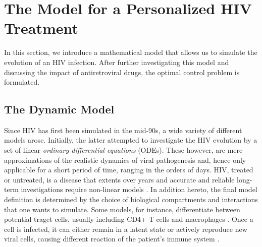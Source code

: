 \section{The Model for a Personalized HIV Treatment}
\label{sec:model}

In this section, we introduce a mathematical model that allows us to simulate the evolution of an HIV infection.
After further investigating this model and discussing the impact of antiretroviral drugs, the optimal control problem is formulated.

\subsection{The Dynamic Model}
\label{subsec:Model_DynModel}

Since HIV has first been simulated in the mid-90s, a wide variety of different models arose.
Initially, the latter attempted to investigate the HIV evolution by a set of linear \textit{ordinary differential 
equations} (ODEs). These however, are mere approximations of the realistic dynamics of viral pathogenesis and, hence only 
applicable for a short period of time, ranging in the orders of days.
HIV, treated or untreated, is a disease that extents over years and accurate and reliable long-term investigations 
require non-linear models \cite{adams2005hiv}.\newline
In addition hereto, the final model definition is determined by the choice of biological compartments and interactions 
that one wants to simulate.
Some models, for instance, differentiate between potential traget cells, usually including CD4+ T cells and macrophages \cite{perelson1993dynamics}.
Once a cell is infected, it can either remain in a latent state or actively reproduce new viral cells, causing different reaction of 
the patient’s immune system \cite{anderson1998complex}.\par

